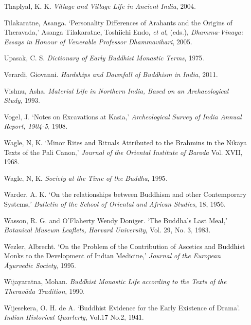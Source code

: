Thaplyal, K. K. \emph{Village and Village Life in Ancient India}, 2004.

\label{footprints_split_022.html_Tilakaratneux202005}
Tilakaratne, Asanga. `Personality Differences of Arahants and the
Origins of Theravada,' Asanga Tilakaratne, Toshiichi Endo, \emph{et al},
(eds.), \emph{Dhamma-Vinaya: Essays in Honour of Venerable Professor
Dhammavihari}, 2005.

\label{footprints_split_022.html_Upasakux201975}
Upasak, C. S. \emph{Dictionary of Early Buddhist Monastic Terms}, 1975.

\label{footprints_split_022.html_Verardiux202011}
Verardi, Giovanni. \emph{Hardships and Downfall of Buddhism in India},
2011.

Vishnu, Asha. \emph{Material Life in Northern India, Based on an
Archaeological Study}, 1993.

\label{footprints_split_022.html_Vogelux201908}
Vogel, J. `Notes on Excavations at Kasia,' \emph{Archeological Survey of
India Annual Report, 1904-5}, 1908.

Wagle, N, K. `Minor Rites and Rituals Attributed to the Brahmins in the
Nikāya Texts of the Pali Canon,' \emph{Journal of the Oriental Institute
of Baroda} Vol. XVII, 1968.

\label{footprints_split_022.html_Wagleux201995}
Wagle, N, K. \emph{Society at the Time of the Buddha}, 1995.

Warder, A. K. `On the relationships between Buddhism and other
Contemporary Systems,' \emph{Bulletin of the School of Oriental and
African Studies}, 18, 1956.

\label{footprints_split_022.html_Wassonux20andux20OFlahertyux201983}
Wasson, R. G. and O'Flaherty Wendy Doniger. `The Buddha's Last Meal,'
\emph{Botanical Museum Leaflets, Harvard University}, Vol. 29, No. 3,
1983.

Wezler, Albrecht. `On the Problem of the Contribution of Ascetics and
Buddhist Monks to the Development of Indian Medicine,' \emph{Journal of
the European Āyurvedic Society}, 1995.

Wijayaratna, Mohan. \emph{Buddhist Monastic Life according to the Texts
of the Theravāda Tradition}, 1990.

\label{footprints_split_022.html_Wijesekeraux201941}
Wijesekera, O. H. de A. `Buddhist Evidence for the Early Existence of
Drama'. \emph{Indian Historical Quarterly}, Vol.17 No.2, 1941.

